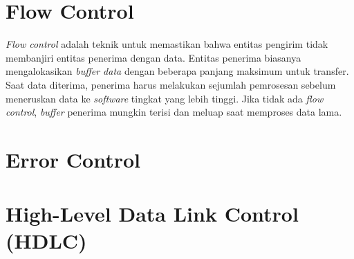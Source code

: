 \section{Flow Control}

\textit{Flow control} adalah teknik untuk memastikan bahwa entitas pengirim tidak membanjiri entitas penerima dengan data. Entitas penerima biasanya mengalokasikan \textit{buffer data} dengan beberapa panjang maksimum untuk transfer. Saat data diterima, penerima harus melakukan sejumlah pemrosesan sebelum meneruskan data ke \textit{software} tingkat yang lebih tinggi. Jika tidak ada \textit{flow control}, \textit{buffer} penerima mungkin terisi dan meluap saat memproses data lama.




\section{Error Control}


\section{High-Level Data Link Control (HDLC)}
